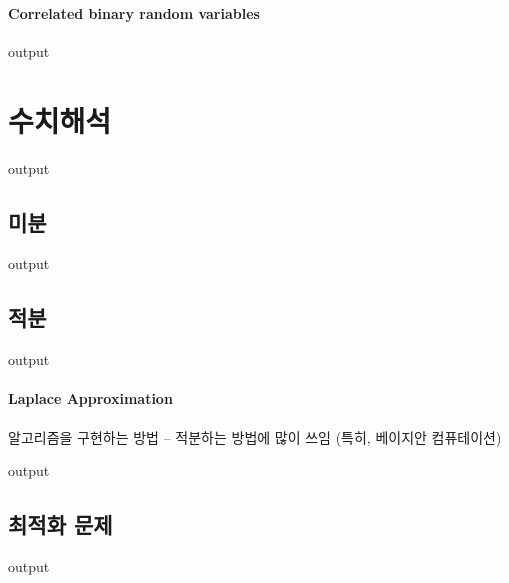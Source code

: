 \paragraph{Correlated binary random variables}
\begin{Schunk}
\begin{Soutput}
output
\end{Soutput}
\end{Schunk}

\section{수치해석}
\begin{Schunk}
\begin{Soutput}
output
\end{Soutput}
\end{Schunk}

\subsection{미분}
\begin{Schunk}
\begin{Soutput}
output
\end{Soutput}
\end{Schunk}

\subsection{적분}
\begin{Schunk}
\begin{Soutput}
output
\end{Soutput}
\end{Schunk}
\paragraph{Laplace Approximation} 알고리즘을 구현하는 방법 -- 적분하는 방법에 많이 쓰임 (특히, 베이지안 컴퓨테이션) 
\begin{Schunk}
\begin{Soutput}
output
\end{Soutput}
\end{Schunk}

\subsection{최적화 문제}
\begin{Schunk}
\begin{Soutput}
output
\end{Soutput}
\end{Schunk}
